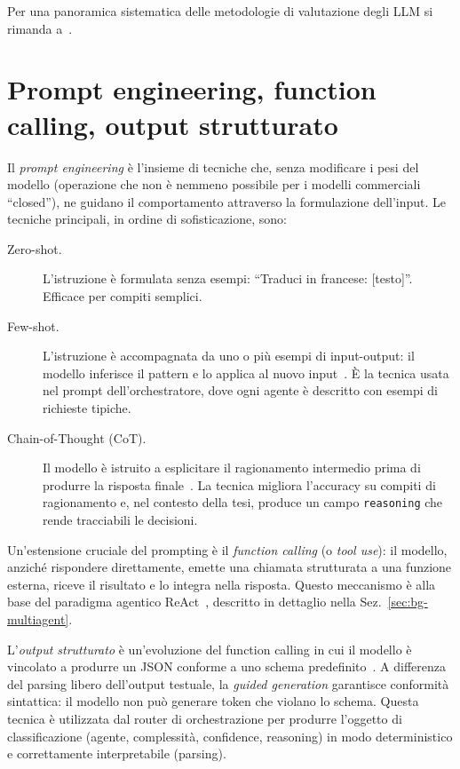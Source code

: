 Per una panoramica sistematica delle metodologie di valutazione degli LLM si rimanda a~\cite{chang2023llmsurvey}.

\section{Prompt engineering, function calling, output strutturato}
\label{sec:bg-prompting}

Il \emph{prompt engineering} è l'insieme di tecniche che, senza modificare i pesi del modello (operazione che non è nemmeno possibile per i 
modelli commerciali ``closed''), ne guidano il comportamento attraverso la formulazione dell'input.
Le tecniche principali, in ordine di sofisticazione, sono:

\begin{description}
  \item[Zero-shot.] L'istruzione è formulata senza esempi: ``Traduci in francese: [testo]''. Efficace per compiti semplici.
  \item[Few-shot.] L'istruzione è accompagnata da uno o più esempi di input-output: il modello inferisce il pattern e lo applica al nuovo input~\cite{brown2020gpt3}. 
  È la tecnica usata nel prompt dell'orchestratore, dove ogni agente è descritto con esempi di richieste tipiche.
  \item[Chain-of-Thought (CoT).] Il modello è istruito a esplicitare il ragionamento intermedio prima di produrre la risposta finale~\cite{wei2022cot}. 
  La tecnica migliora l'accuracy su compiti di ragionamento e, nel contesto della tesi, produce un campo \texttt{reasoning} che rende tracciabili le decisioni.
\end{description}

Un'estensione cruciale del prompting è il \emph{function calling} (o \emph{tool use}): 
il modello, anziché rispondere direttamente, emette una chiamata strutturata a una funzione esterna, 
riceve il risultato e lo integra nella risposta. 
Questo meccanismo è alla base del paradigma agentico ReAct~\cite{yao2022react}, 
descritto in dettaglio nella Sez.~\ref{sec:bg-multiagent}.

L'\emph{output strutturato} è un'evoluzione del function calling in cui il modello 
è vincolato a produrre un JSON conforme a uno schema predefinito~\cite{willard2023outlines}. 
A differenza del parsing libero dell'output testuale, la \emph{guided generation} garantisce conformità sintattica: 
il modello non può generare token che violano lo schema. 
Questa tecnica è utilizzata dal router di orchestrazione per
produrre l'oggetto di classificazione (agente, complessità, confidence, reasoning) 
in modo deterministico e correttamente interpretabile (parsing).

